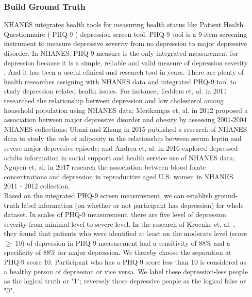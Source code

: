 \documentclass[12pt]{article}
\begin{document}
\subsubsection{Build Ground Truth}
NHANES integrates health tools for measuring health status like Patient Health Questionnaire ( PHQ-9 ) depression screen tool. PHQ-9 tool is a 9-item screening instrument to measure depressive severity from no depression to major depressive disorder. In NHANES, PHQ-9 measure is the only integrated measurement for depression because it is a simple, reliable and valid measure of depression severity \cite{Kroenke}. And it has been a useful clinical and research tool in years. There are plenty of health researches assigning with NHANES data and integrated PHQ-9 tool to study depression related health issues. For instance, Tedders et, al. \cite{Tedders} in 2011 researched the relationship between depression and low cholesterol among household population using NHANES data; Merikangas et, al. \cite{Merikangas} in 2012 proposed a association between major depressive disorder and obesity by assessing 2001-2004 NHANES collections; Ubani and Zhang \cite{Ubani} in 2015 published a research of NHANES data to study the role of adiposity in the relationship between serum leptin and severe major depressive episode; and Andrea et, al. \cite{Andrea} in 2016 explored depressed adults information in social support and health service use of NHANES data; Nguyen et, al. \cite{Nguyen} in 2017 research the association between blood folate concentrations and depression in reproductive aged U.S. women in NHANES 2011 - 2012 collection.
\\

Based on the integrated PHQ-9 screen measurement, we can establish ground-truth label information (on whether or not participant has depression) for whole dataset. In scales of PHQ-9 measurement, there are five level of depression severity from minimal level to severe level. In the research of Kroenke et, al. \cite{Kroenke}, they found that patients who were identified at least on the moderate level (score $\geq$ 10) of depression in PHQ-9 measurement had a sensitivity of 88\% and a specificity of 88\% for major depression. We thereby choose the separation at PHQ-9 score 10. Participant who has a PHQ-9 score less than 10 is considered as a healthy person of depression or vice versa. We label these depression-less people as the logical truth or "1"; reversely those depressive people as the logical false or  "0".
\\
\smallskip
\end{document}
